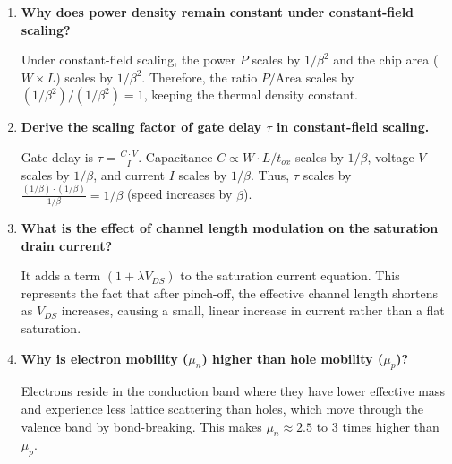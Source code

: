 \documentclass[12pt,a4paper]{article}
\newcommand{\Q}[1]{\textbf{#1}\par\noindent\ignorespaces}
\begin{document}
\begin{tcolorbox}[exambox, title={\textbf{Frequently Asked / Viva Questions}}]
\begin{enumerate}[topsep=0pt, label=\textbf{Q\arabic*.}, itemsep=5pt]
    Since $V_{DS} = 1.5\,\text{V} > 1.2\,\text{V}$, the device is in saturation.\par
    $I_{D,\text{sat}} = \frac{1}{2} \mu_n C_{ox} \frac{W}{L} (V_{GS} - V_{th})^2 = \frac{1}{2} \cdot 100 \cdot 10 \cdot (1.2)^2 = 500 \cdot 1.44 = 720\,\mu\text{A}$.
  \item \Q{Why does power density remain constant under constant-field scaling?}
    Under constant-field scaling, the power $P$ scales by $1/\beta^2$ and the chip area ($W \times L$) scales by $1/\beta^2$. Therefore, the ratio $P/\text{Area}$ scales by $(1/\beta^2)/(1/\beta^2) = 1$, keeping the thermal density constant.
  \item \Q{Derive the scaling factor of gate delay $\tau$ in constant-field scaling.}
    Gate delay is $\tau = \frac{C \cdot V}{I}$. Capacitance $C \propto W \cdot L / t_{ox}$ scales by $1/\beta$, voltage $V$ scales by $1/\beta$, and current $I$ scales by $1/\beta$. Thus, $\tau$ scales by $\frac{(1/\beta) \cdot (1/\beta)}{1/\beta} = 1/\beta$ (speed increases by $\beta$).
  \item \Q{What is the effect of channel length modulation on the saturation drain current?}
    It adds a term $(1 + \lambda V_{DS})$ to the saturation current equation. This represents the fact that after pinch-off, the effective channel length shortens as $V_{DS}$ increases, causing a small, linear increase in current rather than a flat saturation.
  \item \Q{Why is electron mobility ($\mu_n$) higher than hole mobility ($\mu_p$)?}
    Electrons reside in the conduction band where they have lower effective mass and experience less lattice scattering than holes, which move through the valence band by bond-breaking. This makes $\mu_n \approx 2.5$ to $3$ times higher than $\mu_p$.
\end{enumerate}
\end{tcolorbox}
\end{document}
